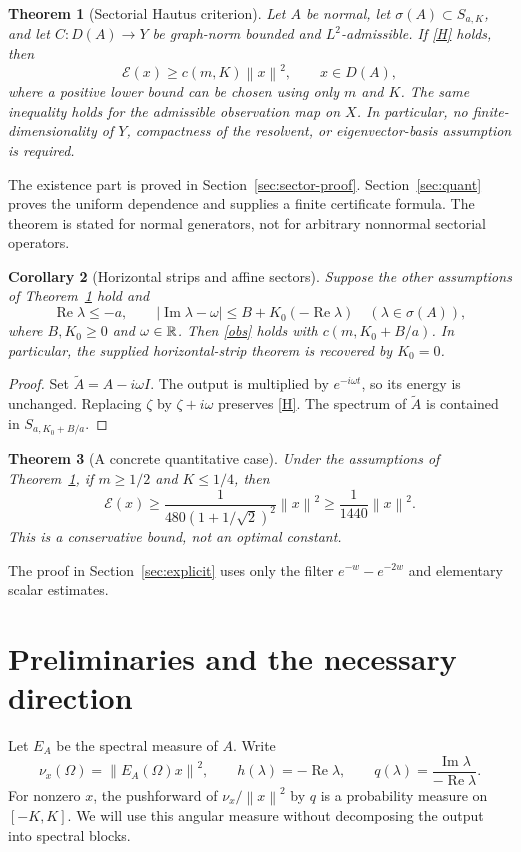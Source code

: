 \documentclass[11pt,a4paper]{article}
\newtheorem{theorem}{Theorem}[section]
\newtheorem{corollary}[theorem]{Corollary}
\theoremstyle{definition}\newtheorem{definition}[theorem]{Definition}
\theoremstyle{remark}\newtheorem{remark}[theorem]{Remark}
\newcommand{\E}{\mathcal E}\newcommand{\D}{\mathcal D}
\DeclareMathOperator{\Rea}{Re}\DeclareMathOperator{\Ima}{Im}
\newcommand{\norm}[1]{\left\lVert #1\right\rVert}
\begin{document}
\begin{theorem}[Sectorial Hautus criterion]\label{main}
Let $A$ be normal, let $\sigma(A)\subset S_{a,K}$, and let $C:D(A)\to Y$ be graph-norm bounded and $L^2$-admissible. If \eqref{H} holds, then
\begin{equation}\label{obs}
 \E(x)\ge c(m,K)\norm{x}^2,\qquad x\in D(A),
\end{equation}
where a positive lower bound can be chosen using only $m$ and $K$. The same inequality holds for the admissible observation map on $X$. In particular, no finite-dimensionality of $Y$, compactness of the resolvent, or eigenvector-basis assumption is required.
\end{theorem}
The existence part is proved in Section~\ref{sec:sector-proof}. Section~\ref{sec:quant} proves the uniform dependence and supplies a finite certificate formula. The theorem is stated for normal generators, not for arbitrary nonnormal sectorial operators.

\begin{corollary}[Horizontal strips and affine sectors]\label{affine}
Suppose the other assumptions of Theorem~\ref{main} hold and
\[
 \Rea\lambda\le-a,\qquad
 |\Ima\lambda-\omega|\le B+K_0(-\Rea\lambda)
 \quad(\lambda\in\sigma(A)),
\]
where $B,K_0\ge0$ and $\omega\in\mathbb R$. Then \eqref{obs} holds with
$c(m,K_0+B/a)$. In particular, the supplied horizontal-strip theorem is recovered by $K_0=0$.
\end{corollary}
\begin{proof}
Set $\widetilde A=A-i\omega I$. The output is multiplied by $e^{-i\omega t}$, so its energy is unchanged. Replacing $\zeta$ by $\zeta+i\omega$ preserves \eqref{H}. The spectrum of $\widetilde A$ is contained in $S_{a,K_0+B/a}$.
\end{proof}

\begin{theorem}[A concrete quantitative case]\label{explicit-main}
Under the assumptions of Theorem~\ref{main}, if $m\ge1/2$ and $K\le1/4$, then
\begin{equation}\label{explicit}
 \E(x)\ge\frac{1}{480(1+1/\sqrt2)^2}\norm{x}^2
 \ge\frac1{1440}\norm{x}^2.
\end{equation}
This is a conservative bound, not an optimal constant.
\end{theorem}
The proof in Section~\ref{sec:explicit} uses only the filter $e^{-w}-e^{-2w}$ and elementary scalar estimates.

\section{Preliminaries and the necessary direction}
Let $E_A$ be the spectral measure of $A$. Write
\[
 \nu_x(\Omega)=\norm{E_A(\Omega)x}^2,
 \qquad h(\lambda)=-\Rea\lambda,
 \qquad q(\lambda)=\frac{\Ima\lambda}{-\Rea\lambda}.
\]
For nonzero $x$, the pushforward of $\nu_x/\norm{x}^2$ by $q$ is a probability measure on $[-K,K]$. We will use this angular measure without decomposing the output into spectral blocks.
\end{document}
